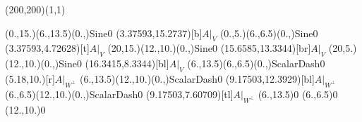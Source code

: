 \unitlength=1bp%

\begin{feynartspicture}(200,200)(1,1)

\FADiagram{}
\FAProp(0.,15.)(6.,13.5)(0.,){Sine}{0}
\FALabel(3.37593,15.2737)[b]{$A|_V$}
\FAProp(0.,5.)(6.,6.5)(0.,){Sine}{0}
\FALabel(3.37593,4.72628)[t]{$A|_V$}
\FAProp(20,15.)(12.,10.)(0.,){Sine}{0}
\FALabel(15.6585,13.3344)[br]{$A|_V$}
\FAProp(20,5.)(12.,10.)(0.,){Sine}{0}
\FALabel(16.3415,8.3344)[bl]{$A|_V$}
\FAProp(6.,13.5)(6.,6.5)(0.,){ScalarDash}{0}
\FALabel(5.18,10.)[r]{$A|_{W^\perp}$}
\FAProp(6.,13.5)(12.,10.)(0.,){ScalarDash}{0}
\FALabel(9.17503,12.3929)[bl]{$A|_{W^\perp}$}
\FAProp(6.,6.5)(12.,10.)(0.,){ScalarDash}{0}
\FALabel(9.17503,7.60709)[tl]{$A|_{W^\perp}$}
\FAVert(6.,13.5){0}
\FAVert(6.,6.5){0}
\FAVert(12.,10.){0}
\end{feynartspicture}

